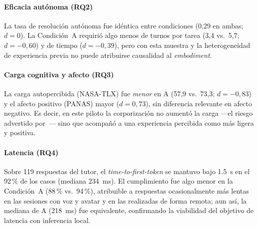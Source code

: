 \documentclass[conference]{IEEEtran}
\begin{document}
\paragraph{Eficacia aut\'onoma (RQ2)} La tasa de resoluci\'on aut\'onoma fue id\'entica entre
condiciones (0{,}29 en ambas; $d=0$). La Condici\'on~A requiri\'o algo menos de turnos por tarea
(3{,}4 vs.\ 5{,}7; $d=-0{,}60$) y de tiempo ($d=-0{,}39$), pero con esta muestra y la heterogeneidad
de experiencia previa no puede atribuirse causalidad al \emph{embodiment}.

\paragraph{Carga cognitiva y afecto (RQ3)} La carga autopercibida (NASA-TLX) fue \emph{menor} en A
(57{,}9 vs.\ 73{,}3; $d=-0{,}83$) y el afecto positivo (PANAS) mayor ($d=0{,}73$), sin diferencia
relevante en afecto negativo. Es decir, en este piloto la corporizaci\'on no aument\'o la carga
---el riesgo advertido por~\cite{li2025cognitiveload}--- sino que acompa\~n\'o a una experiencia
percibida como m\'as ligera y positiva.

\paragraph{Latencia (RQ4)} Sobre 119 respuestas del tutor, el \emph{time-to-first-token} se mantuvo
bajo 1.5~s en el 92\,\% de los casos (mediana 234~ms). El cumplimiento fue algo menor en la
Condici\'on~A (88\,\% vs.\ 94\,\%), atribuible a respuestas ocasionalmente m\'as lentas en las
sesiones con voz y avatar y en las realizadas de forma remota; aun as\'i, la mediana de A (218~ms)
fue equivalente, confirmando la viabilidad del objetivo de latencia con inferencia local.
\end{document}
